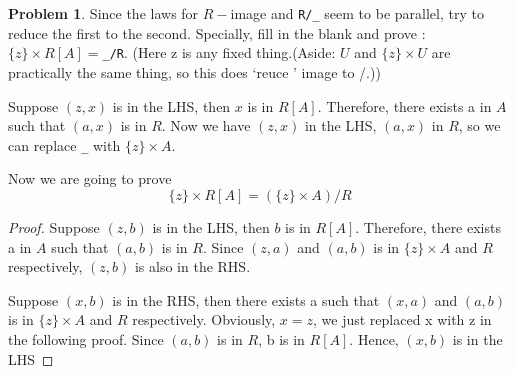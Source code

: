 \documentclass[a4paper,11pt]{article}%
\theoremstyle{remark}
\theoremstyle{definition}
\newtheorem{problem}{Problem}[subsection]
\begin{document}
\begin{problem}
    Since the laws for $R-$image and \verb+R/_+ seem to be parallel, try to reduce the 
    first to the second. Specially, fill in the blank and prove :$\{z\}\times R[A]=$\verb+_/R+.
    (Here z is any fixed thing.(Aside: $U$ and $\{z\}\times U$ are practically the same thing, 
    so this does `reuce ' image to /.))

    Suppose $(z,x)$ is in the LHS, then $x$ is in $R[A]$. Therefore, there exists 
    a in $A$ such that $(a,x)$ is in $R$. Now we have $(z,x)$ in the LHS, $(a,x)$ in $R$, so
    we can replace \verb+_+ with $\{z\}\times A$.

    Now we are going to prove
    \[\{z\}\times R[A] =(\{z\}\times A)/R\]
    \begin{proof}
       Suppose $(z,b)$ is in the LHS, then $b$ is in $R[A]$.
       Therefore, there exists a in $A$ such that $(a,b)$ is in $R$.
       Since $(z,a)$ and $(a,b)$ is in $\{z\}\times A$ and $R$ respectively,
       $(z,b)$ is also in the RHS. 

       Suppose $(x,b)$ is in the RHS, then there exists a such that $(x,a)$ and $(a,b)$
       is in $\{z\}\times A$ and $R$ respectively. Obviously, $x=z$, we just replaced x with z
       in the following proof. Since $(a,b)$ is in $R$, b is in $R[A]$. Hence, $(x,b)$ is in the LHS
    \end{proof}
\end{problem}
\end{document}
